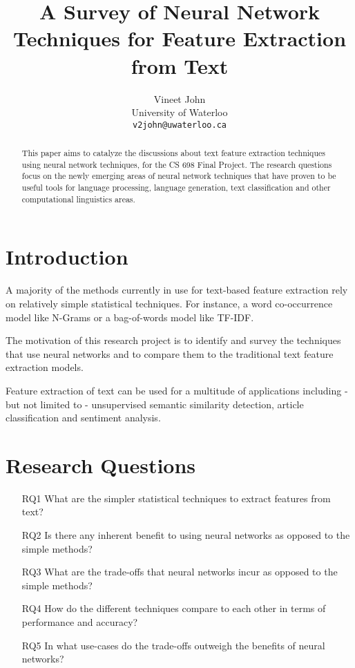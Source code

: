 \documentclass[11pt,a4paper]{article}
\title{A Survey of Neural Network Techniques for Feature Extraction from Text}
\author{
  Vineet John \\
  University of Waterloo \\
  {\tt v2john@uwaterloo.ca} \\
}
\date{}
\begin{document}
\maketitle


\begin{abstract}
  This paper aims to catalyze the discussions about text feature extraction techniques using neural network techniques, for the CS 698 Final Project. The research questions focus on the newly emerging areas of neural network techniques that have proven to be useful tools for language processing, language generation, text classification and other computational linguistics areas.
\end{abstract}


\section{Introduction} %
\label{sec:introduction}

  A majority of the methods currently in use for text-based feature extraction rely on relatively simple statistical techniques. For instance, a word co-occurrence model like N-Grams or a bag-of-words model like TF-IDF.

  The motivation of this research project is to identify and survey the techniques that use neural networks and to compare them to the traditional text feature extraction models.

  Feature extraction of text can be used for a multitude of applications including - but not limited to - unsupervised semantic similarity detection, article classification and sentiment analysis.


\section{Research Questions} %
\label{sec:research_questions}

  \begin{itemize}
    \item [RQ1] What are the simpler statistical techniques to extract features from text?
    \item [RQ2] Is there any inherent benefit to using neural networks as opposed to the simple methods?
    \item [RQ3] What are the trade-offs that neural networks incur as opposed to the simple methods?
    \item [RQ4] How do the different techniques compare to each other in terms of performance and accuracy?
    \item [RQ5] In what use-cases do the trade-offs outweigh the benefits of neural networks?
  \end{itemize}
\end{document}
